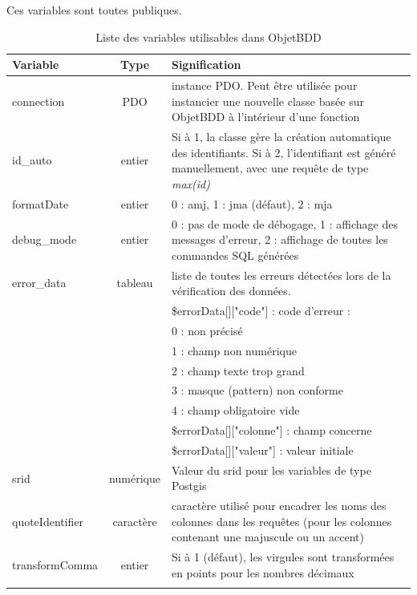 Ces variables sont toutes publiques.
\begin{longtable}{|p{3cm}|c|p{8.5cm}|}
\hline
\textbf{Variable} & \textbf{Type} & \textbf{Signification} \\
\hline
\endhead
connection & PDO & instance PDO. Peut être utilisée pour instancier une nouvelle classe basée sur ObjetBDD à l'intérieur d'une fonction \\

id\_auto & entier & Si à 1, la classe gère la création automatique des identifiants. Si à 2, l'identifiant est généré manuellement, avec une requête de type \textit{max(id)} \\

formatDate & entier & 0 : amj, 1 : jma (défaut), 2 : mja \\
\hline
debug\_mode & entier & 0 : pas de mode de débogage, 1 : affichage des messages d'erreur, 2 : affichage de toutes les commandes SQL générées
\\

error\_data & tableau & liste de toutes les erreurs détectées lors de la vérification des données.  \\
 & & \$errorData[]["code"] : code d'erreur : \\
	& & 0 : non précisé \\
	& & 1 : champ non numérique \\
	& & 2 : champ texte trop grand \\
	& & 3 : masque (pattern) non conforme \\
	& & 4 : champ obligatoire vide \\
	& & \$errorData[]["colonne"] : champ concerne \\
	& & \$errorData[]["valeur"] : valeur initiale \\

srid & numérique & Valeur du srid pour les variables de type Postgis \\

quoteIdentifier & caractère & caractère utilisé pour encadrer les noms des colonnes dans les requêtes (pour les colonnes contenant une majuscule ou un accent) \\

transformComma & entier & Si à 1 (défaut), les virgules sont transformées en points pour les nombres décimaux \\
\hline

\caption{Liste des variables utilisables dans ObjetBDD}

\end{longtable}

